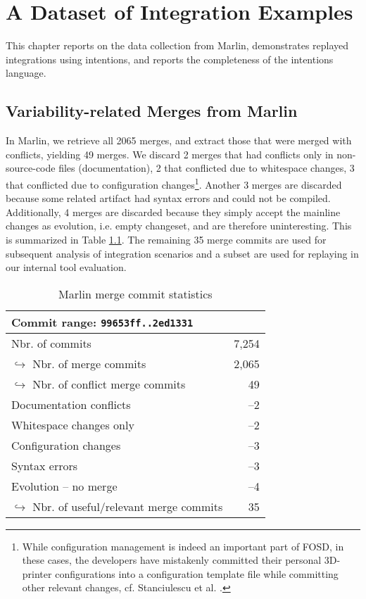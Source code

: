 \chapter{A Dataset of Integration Examples}
This chapter reports on the data collection from Marlin, demonstrates replayed integrations using intentions, and reports the completeness of the intentions language.

\section{Variability-related Merges from Marlin}\label{data-coll-res}
In Marlin, we retrieve all 2065 merges, and extract those that were merged with conflicts, yielding 49 merges. We discard 2 merges that had conflicts only in non-source-code files (documentation), 2 that conflicted due to whitespace changes, 3 that conflicted due to configuration changes\footnote{While configuration management is indeed an important part of FOSD, in these cases, the developers have mistakenly committed their personal 3D-printer configurations into a configuration template file while committing other relevant changes, cf. Stanciulescu et al. \cite{stanciulescu2015}.}. Another 3 merges are discarded because some related artifact had syntax errors and could not be compiled. Additionally, 4 merges are discarded because they simply accept the mainline changes as evolution, i.e. empty changeset, and are therefore uninteresting. This is summarized in Table \ref{tab:marlinmerge}. The remaining 35 merge commits are used for subsequent analysis of integration scenarios and a subset are used for replaying in our internal tool evaluation.

\begin{table}[h]
    \centering
    \caption{Marlin merge commit statistics}
    \label{tab:marlinmerge}
    \begin{tabular}{l r}
    \hline\hline
        Commit range: \texttt{99653ff..2ed1331}& \\\hline
        Nbr. of commits & 7,254\\
        $\hookrightarrow$ Nbr. of merge commits & 2,065 \\
        \hspace{1em}$\hookrightarrow$ Nbr. of conflict merge commits & 49 \\
        \hspace{1em}Documentation conflicts & --2\\
        \hspace{1em}Whitespace changes only & --2\\
        \hspace{1em}Configuration changes & --3\\
        \hspace{1em}Syntax errors & --3\\
        \hspace{1em}Evolution -- no merge & --4\\
        \hspace{2em}$\hookrightarrow$ Nbr. of useful/relevant merge commits & 35\\
    \hline\hline
    \end{tabular}
\end{table}

